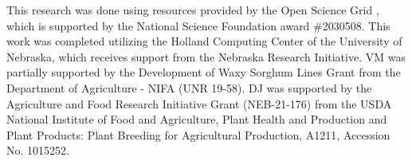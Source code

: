 This research was done using resources provided by the Open Science Grid \cite{osg07, osg09}, which is supported by the National Science Foundation award \#2030508. This work was completed utilizing the Holland Computing Center of the University of Nebraska,
which receives support from the Nebraska Research Initiative. VM was partially supported by the Development of Waxy Sorghum Lines Grant from the Department of Agriculture - NIFA (UNR 19-58). DJ was supported by the Agriculture and Food Research Initiative Grant (NEB-21-176) from the USDA National Institute of Food and Agriculture, Plant Health and Production and Plant Products: Plant Breeding for Agricultural Production, A1211, Accession No. 1015252.